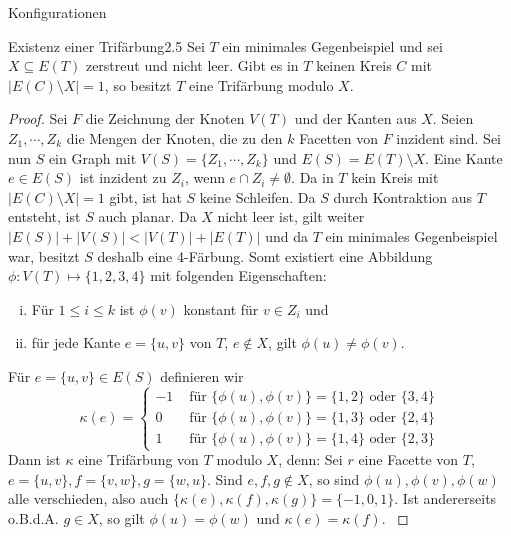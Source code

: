 \begin{section}{Konfigurationen}
 \begin{satzl}{Existenz einer Trifärbung}{2.5}
  Sei $T$ ein minimales Gegenbeispiel und sei $X\subseteq E(T)$ zerstreut und nicht leer. Gibt es in $T$ keinen Kreis $C$ mit $|E(C) \setminus X| = 1$, so besitzt $T$ eine Trifärbung modulo $X$.
 \end{satzl}
 \begin{proof}
  Sei $F$ die Zeichnung der Knoten $V(T)$ und der Kanten aus $X$. Seien $Z_1,\cdots,Z_k$ die Mengen der Knoten, die zu den $k$ Facetten von $F$ inzident sind. Sei nun $S$ ein Graph mit $V(S) =\{Z_1,\cdots,Z_k\}$ und $E(S) = E(T) \setminus X$. Eine Kante $e \in E(S)$ ist inzident zu  $Z_i$, wenn $e \cap Z_i \neq \emptyset$. Da in $T$ kein Kreis mit $|E(C) \setminus X| = 1$ gibt, ist hat $S$ keine Schleifen. Da $S$ durch Kontraktion aus $T$ entsteht, ist $S$ auch planar. Da $X$ nicht leer ist, gilt weiter $|E(S)| + |V(S)| < |V(T)| + |E(T)|$ und da $T$ ein minimales Gegenbeispiel war, besitzt $S$ deshalb eine 4-Färbung. Somt existiert eine Abbildung $\phi: V(T) \mapsto \{1,2,3,4\}$ mit folgenden Eigenschaften:
  \begin{enumerate}[(i)]
   \item Für $1 \leq i \leq k$ ist $\phi(v)$ konstant für $v \in Z_i$ und
   \item für jede Kante $e=\{u,v\}$ von $T$, $e\not\in X$, gilt $\phi(u) \neq \phi(v)$.
  \end{enumerate}
  Für $e=\{u,v\} \in E(S)$ definieren wir\\
  \[\kappa(e) = \begin{cases}
                -1 &\text{ für } \{\phi(u), \phi(v)\} = \{1,2\}\text{ oder } \{3,4\}\\
                0  &\text{ für } \{\phi(u), \phi(v)\} = \{1,3\}\text{ oder } \{2,4\}\\
                1  &\text{ für } \{\phi(u), \phi(v)\} = \{1,4\}\text{ oder } \{2,3\}  
               \end{cases}\]
  Dann ist $\kappa$ eine Trifärbung von $T$ modulo $X$, denn: Sei $r$ eine Facette von $T$, $e=\{u,v\},f=\{v,w\},g=\{w,u\}$. Sind $e,f,g \not\in X$, so sind $\phi(u),\phi(v),\phi(w)$ alle verschieden, also auch $\{\kappa(e),\kappa(f),\kappa(g)\}=\{-1,0,1\}$. Ist andererseits o.B.d.A. $g\in X$, so gilt $\phi(u) = \phi(w)$ und $\kappa(e)=\kappa(f)$. \cite{FourRSST}
 \end{proof}
\end{section}